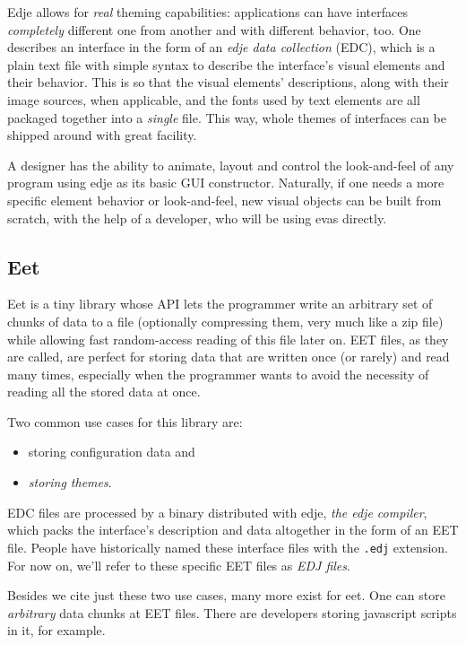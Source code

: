 \documentclass[a4paper]{profusion}
\begin{document}
Edje allows for \emph{real} theming capabilities: applications can have
interfaces \emph{completely} different one from another and with
different behavior, too. One describes an interface in the form of an
\emph{edje data collection} (EDC), which is a plain text file with
simple syntax to describe the interface's visual elements and their
behavior. This is so that the visual elements' descriptions, along
with their image sources, when applicable, and the fonts used by text
elements are all packaged together into a \emph{single} file. This
way, whole themes of interfaces can be shipped around with great
facility.

A designer has the ability to animate, layout and control the
look-and-feel of any program using edje as its basic GUI
constructor. Naturally, if one needs a more specific element behavior
or look-and-feel, new visual objects can be built from scratch, with
the help of a developer, who will be using evas directly.

\subsection{Eet}

Eet is a tiny library whose API lets the programmer write an arbitrary
set of chunks of data to a file (optionally compressing them, very
much like a zip file) while allowing fast random-access reading of
this file later on. EET files, as they are called, are perfect for
storing data that are written once (or rarely) and read many times,
especially when the programmer wants to avoid the necessity of reading
all the stored data at once.

Two common use cases for this library are:
\begin{itemize}
\item storing configuration data and
\item \emph{storing themes}.
\end{itemize}

EDC files are processed by a binary distributed with edje, \emph{the
 edje compiler}, which packs the interface's description and data
altogether in the form of an EET file. People have historically named
these interface files with the \texttt{.edj} extension.  For now on,
we'll refer to these specific EET files as \emph{EDJ files}.

Besides we cite just these two use cases, many more exist for eet. One
can store \emph{arbitrary} data chunks at EET files. There are
developers storing javascript scripts in it, for example.
\end{document}
